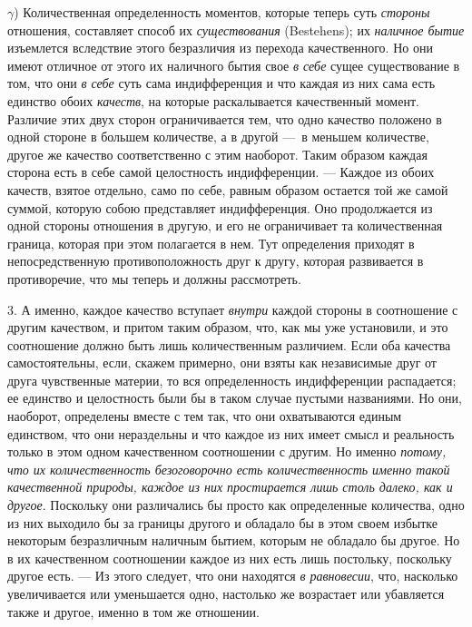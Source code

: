 $\gamma$) Количественная определенность моментов,
которые теперь суть {\em стороны} отношения, составляет
способ их {\em существования} (Bestehens); их
{\em наличное бытие} изъемлется вследствие этого
безразличия из перехода качественного. Но они имеют отличное от этого их
наличного бытия свое {\em в себе} сущее существование в
том, что они {\em в себе} суть сама индифференция и что
каждая из них сама есть единство обоих {\em качеств},
на которые раскалывается качественный момент. Различие этих двух сторон
ограничивается тем, что одно качество положено в одной стороне в большем
количестве, а в другой —~в меньшем количестве, другое же качество
соответственно с этим наоборот. Таким образом каждая сторона есть в себе
самой целостность индифференции. — Каждое из обоих качеств, взятое отдельно,
само по себе, равным образом остается той же самой суммой, которую собою
представляет индифференция. Оно продолжается из одной стороны отношения в
другую, и его не ограничивает та количественная граница, которая при этом
полагается в нем. Тут определения приходят в непосредственную
противоположность друг к другу, которая развивается в противоречие, что мы
теперь и должны рассмотреть.

3. А именно, каждое качество вступает {\em внутри}
каждой стороны в соотношение с другим качеством, и притом таким образом,
что, как мы уже установили, и это соотношение должно быть лишь
количественным различием. Если оба качества самостоятельны, если, скажем
примерно, они взяты как независимые друг от друга чувственные материи, то
вся определенность индифференции распадается; ее единство и целостность были
бы в таком случае пустыми названиями. Но они, наоборот, определены вместе с
тем так, что они охватываются единым единством, что они нераздельны и что
каждое из них имеет смысл и реальность только в этом одном качественном
соотношении с другим. Но именно {\em потому, что их
количественность безоговорочно есть количественность именно такой
качественной природы, каждое из них простирается лишь столь далеко, как и
другое}. Поскольку они различались бы просто как определенные количества,
одно из них выходило бы за границы другого и обладало бы в этом своем
избытке некоторым безразличным наличным бытием, которым не обладало бы
другое. Но в их качественном соотношении каждое из них есть лишь постольку,
поскольку другое есть. — Из этого следует, что они находятся
{\em в равновесии}, что, насколько увеличивается или
уменьшается одно, настолько же возрастает или убавляется также и другое,
именно в том же отношении.

